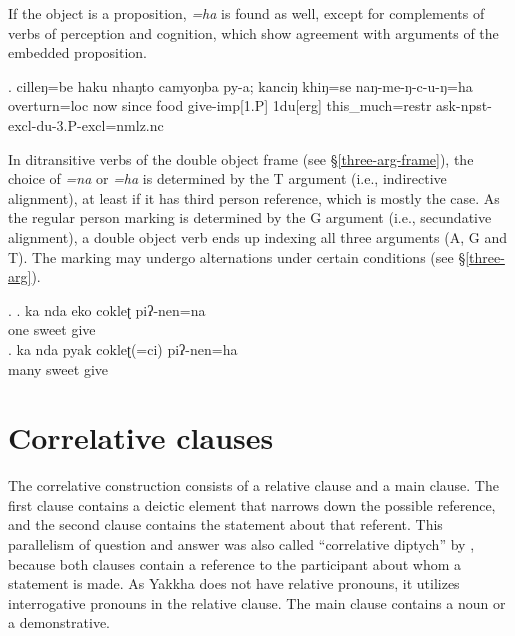 	
If the object is a proposition, \emph{=ha} is found as well, except for complements of verbs of perception and cognition, which show agreement with arguments of the embedded proposition.


\exg. cilleŋ=be     haku nhaŋto camyoŋba py-a;  kanciŋ khiŋ=se   naŋ-me-ŋ-c-u-ŋ=ha\\
 overturn{\sc =loc} now since   food give{\sc -imp[1.P]} {\sc 1du[erg]} this\_much{\sc =restr} ask{\sc -npst-excl-du-3.P-excl=nmlz.nc}\\
  	

   
In ditransitive verbs of the double object frame (see §\ref{three-arg-frame}), the choice of \emph{=na} or \emph{=ha}  is determined by the T argument (i.e., indirective alignment), at least if it has third person reference, which is mostly the case. As the regular person marking is determined by the G argument (i.e., secundative alignment), a double object verb ends up indexing all three arguments (A, G and T). The marking may undergo alternations under certain conditions (see §\ref{three-arg}).


 \ex. \ag. ka nda eko cokleʈ piʔ-nen=na\\
			  one sweet give\\
			\bg. ka nda pyak cokleʈ(=ci) piʔ-nen=ha\\
			  many sweet give\\



\section{Correlative clauses}\label{correlative}

The correlative construction consists of a relative clause and a main clause. The first clause contains  a deictic element that narrows down the possible reference, and the second clause contains the statement about that referent. This parallelism of question and answer was also called  “correlative diptych” by \citet{Lehmann1988Towards}, because both clauses contain a reference to the participant about whom a statement is made. As Yakkha does not have relative pronouns, it utilizes interrogative pronouns in the relative clause. The main clause contains a noun or a demonstrative. 


